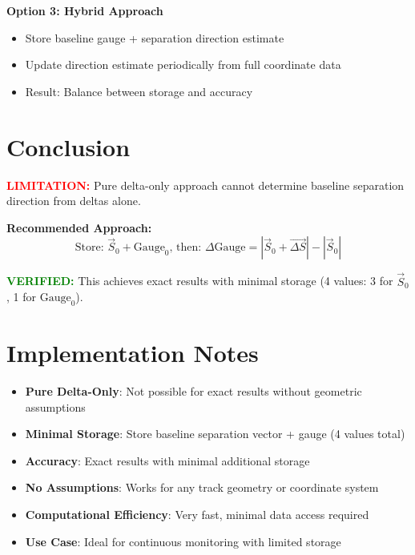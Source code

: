 \documentclass{article}
\begin{document}
\textbf{Option 3: Hybrid Approach}
\begin{itemize}
\item Store baseline gauge + separation direction estimate
\item Update direction estimate periodically from full coordinate data
\item Result: Balance between storage and accuracy
\end{itemize}

\section{Conclusion}
\textcolor{red}{\textbf{LIMITATION:}} Pure delta-only approach cannot determine baseline separation direction from deltas alone.

\textbf{Recommended Approach:}
\begin{equation}
\boxed{\text{Store: } \vec{S}_0 + \text{Gauge}_0 \text{, then: } \Delta\text{Gauge} = |\vec{S}_0 + \vec{\Delta S}| - |\vec{S}_0|}
\end{equation}

\textcolor{green}{\textbf{VERIFIED:}} This achieves exact results with minimal storage (4 values: 3 for $\vec{S}_0$, 1 for $\text{Gauge}_0$).

\section{Implementation Notes}
\begin{itemize}
\item \textbf{Pure Delta-Only}: Not possible for exact results without geometric assumptions
\item \textbf{Minimal Storage}: Store baseline separation vector + gauge (4 values total)
\item \textbf{Accuracy}: Exact results with minimal additional storage
\item \textbf{No Assumptions}: Works for any track geometry or coordinate system
\item \textbf{Computational Efficiency}: Very fast, minimal data access required
\item \textbf{Use Case}: Ideal for continuous monitoring with limited storage
\end{itemize}
\end{document}
